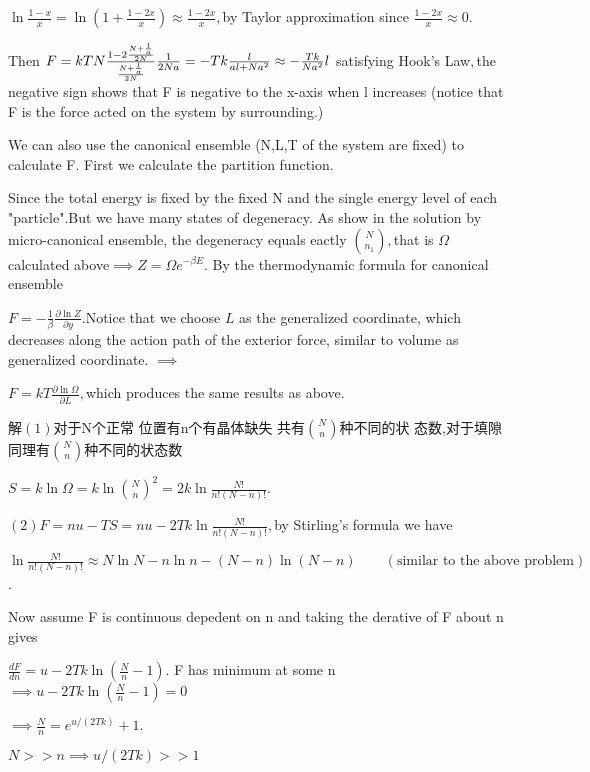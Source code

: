 \documentclass{ctexart}
\begin{document}
$\ln \frac{1-x}{x}=\ln \left( 1+\frac{1-2x}{x}\right) \approx \frac{1-2x}{x}%
, $by Taylor approximation since $\frac{1-2x}{x}\approx 0.$

Then $F=kTN\frac{1-2\frac{N+\frac{l}{a}}{2N}}{\frac{N+\frac{l}{a}}{2N}}\frac{%
1}{2Na}=\allowbreak -Tk\frac{l}{al+Na^{2}}\approx -\frac{Tk}{Na^{2}}l$
satisfying Hook's Law$,$the negative sign shows that F is negative to the
x-axis when l increases (notice that F is the force acted on the system by
surrounding.)

We can also use the canonical ensemble (N,L,T of the system are fixed) to
calculate F. First we calculate the partition function.

Since the total energy is fixed by the fixed N and the single energy level
of each "particle".But we have many states of degeneracy. As show in the
solution by micro-canonical ensemble, the degeneracy equals eactly $\binom{N%
}{n_{1}},$that is $\Omega $ calculated above$\implies Z=\Omega e^{-\beta E}.$%
By the thermodynamic formula for canonical ensemble

$F=-\frac{1}{\beta }\frac{\partial \ln Z}{\partial y}.$Notice that we choose 
$L$ as the generalized coordinate, which decreases along the action path of
the exterior force, similar to volume as generalized coordinate. $\implies $

$F=kT\frac{\partial \ln \Omega }{\partial L},$which produces the same
results as above.


解\qquad $\left( 1\right) $对于N个正常%
位置有n个有晶体缺失%
共有$\binom{N}{n}$种不同的状%
态数,对于填隙同理有$%
\binom{N}{n}$种不同的状态数

$S=k\ln \Omega =k\ln \binom{N}{n}^{2}=2k\ln \frac{N!}{n!\left( N-n\right) !}%
. $

$\left( 2\right) F=nu-TS=nu-2Tk\ln \frac{N!}{n!\left( N-n\right) !},$by
Stirling's formula we have

$\ln \frac{N!}{n!\left( N-n\right) !}\approx N\ln N-n\ln n-\left( N-n\right)
\ln \left( N-n\right) \qquad \left( \text{similar to the above problem}%
\right) $.

Now assume F is continuous depedent on n and taking the derative of F about
n gives

$\frac{dF}{dn}=u-2Tk\ln \left( \frac{N}{n}-1\right) .$ F has minimum at some
n$\implies u-2Tk\ln \left( \frac{N}{n}-1\right) =0$

$\implies \frac{N}{n}=e^{u/\left( 2Tk\right) }+1.$

$N>>n\implies u/\left( 2Tk\right) >>1$
\end{document}
